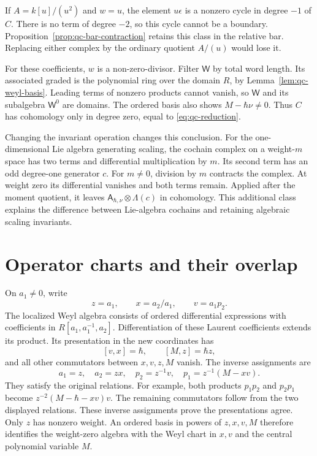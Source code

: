 If $A=k[u]/(u^2)$ and $w=u$, the element $u\epsilon$ is a nonzero cycle in degree $-1$ of $C$.
There is no term of degree $-2$, so this cycle cannot be a boundary.
Proposition~\ref{prop:qc-bar-contraction} retains this class in the relative bar.
Replacing either complex by the ordinary quotient $A/(u)$ would lose it.

For these coefficients, $w$ is a non-zero-divisor.
Filter $\mathsf W$ by total word length.
Its associated graded is the polynomial ring over the domain $R$, by Lemma~\ref{lem:qc-weyl-basis}.
Leading terms of nonzero products cannot vanish, so $\mathsf W$ and its subalgebra $\mathsf W^0$ are domains.
The ordered basis also shows $M-\hbar\nu\ne0$.
Thus $C$ has cohomology only in degree zero, equal to \eqref{eq:qc-reduction}.

Changing the invariant operation changes this conclusion.
For the one-dimensional Lie algebra generating scaling, the cochain complex on a weight-$m$ space has two terms and differential multiplication by $m$.
Its second term has an odd degree-one generator $c$.
For $m\ne0$, division by $m$ contracts the complex.
At weight zero its differential vanishes and both terms remain.
Applied after the moment quotient, it leaves
$\mathsf A_{\hbar,\nu}\otimes\Lambda(c)$ in cohomology.
This additional class explains the difference between Lie-algebra cochains and retaining algebraic scaling invariants.

\section{Operator charts and their overlap}

On $a_1\ne0$, write
\[
 z=a_1,\qquad x=a_2/a_1,\qquad v=a_1p_2.
\]
The localized Weyl algebra consists of ordered differential expressions with coefficients in $R[a_1,a_1^{-1},a_2]$.
Differentiation of these Laurent coefficients extends its product.
Its presentation in the new coordinates has
\[
 [v,x]=\hbar,\qquad [M,z]=\hbar z,
\]
and all other commutators between $x,v,z,M$ vanish.
The inverse assignments are
\[
 a_1=z,\quad a_2=zx,\quad
 p_2=z^{-1}v,\quad p_1=z^{-1}(M-xv).
\]
They satisfy the original relations.
For example, both products $p_1p_2$ and $p_2p_1$ become
$z^{-2}(M-\hbar-xv)v$.
The remaining commutators follow from the two displayed relations.
These inverse assignments prove the presentations agree.
Only $z$ has nonzero weight.
An ordered basis in powers of $z,x,v,M$ therefore identifies the weight-zero algebra with the Weyl chart in $x,v$ and the central polynomial variable $M$.


